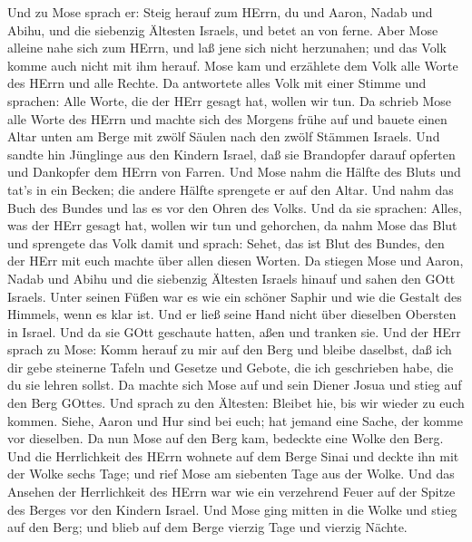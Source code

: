  Und zu Mose sprach er: Steig herauf zum HErrn, du und
Aaron, Nadab und Abihu, und die siebenzig Ältesten Israels, und betet an
von ferne.  Aber Mose alleine nahe sich zum HErrn, und laß
jene sich nicht herzunahen; und das Volk komme auch nicht mit ihm
herauf.  Mose kam und erzählete dem Volk alle Worte des
HErrn und alle Rechte. Da antwortete alles Volk mit einer Stimme und
sprachen: Alle Worte, die der HErr gesagt hat, wollen wir tun.
 Da schrieb Mose alle Worte des HErrn und machte sich des
Morgens frühe auf und bauete einen Altar unten am Berge mit zwölf Säulen
nach den zwölf Stämmen Israels.  Und sandte hin Jünglinge
aus den Kindern Israel, daß sie Brandopfer darauf opferten und Dankopfer
dem HErrn von Farren.  Und Mose nahm die Hälfte des Bluts
und tat's in ein Becken; die andere Hälfte sprengete er auf den Altar.
 Und nahm das Buch des Bundes und las es vor den Ohren des
Volks. Und da sie sprachen: Alles, was der HErr gesagt hat, wollen wir
tun und gehorchen,  da nahm Mose das Blut und sprengete das
Volk damit und sprach: Sehet, das ist Blut des Bundes, den der HErr mit
euch machte über allen diesen Worten.  Da stiegen Mose und
Aaron, Nadab und Abihu und die siebenzig Ältesten Israels hinauf
 und sahen den GOtt Israels. Unter seinen Füßen war es wie
ein schöner Saphir und wie die Gestalt des Himmels, wenn es klar ist.
 Und er ließ seine Hand nicht über dieselben Obersten in
Israel. Und da sie GOtt geschaute hatten, aßen und tranken sie.
 Und der HErr sprach zu Mose: Komm herauf zu mir auf den
Berg und bleibe daselbst, daß ich dir gebe steinerne Tafeln und Gesetze
und Gebote, die ich geschrieben habe, die du sie lehren sollst.
 Da machte sich Mose auf und sein Diener Josua und stieg
auf den Berg GOttes.  Und sprach zu den Ältesten: Bleibet
hie, bis wir wieder zu euch kommen. Siehe, Aaron und Hur sind bei euch;
hat jemand eine Sache, der komme vor dieselben.  Da nun
Mose auf den Berg kam, bedeckte eine Wolke den Berg.  Und
die Herrlichkeit des HErrn wohnete auf dem Berge Sinai und deckte ihn
mit der Wolke sechs Tage; und rief Mose am siebenten Tage aus der Wolke.
 Und das Ansehen der Herrlichkeit des HErrn war wie ein
verzehrend Feuer auf der Spitze des Berges vor den Kindern Israel.
 Und Mose ging mitten in die Wolke und stieg auf den Berg;
und blieb auf dem Berge vierzig Tage und vierzig Nächte.

